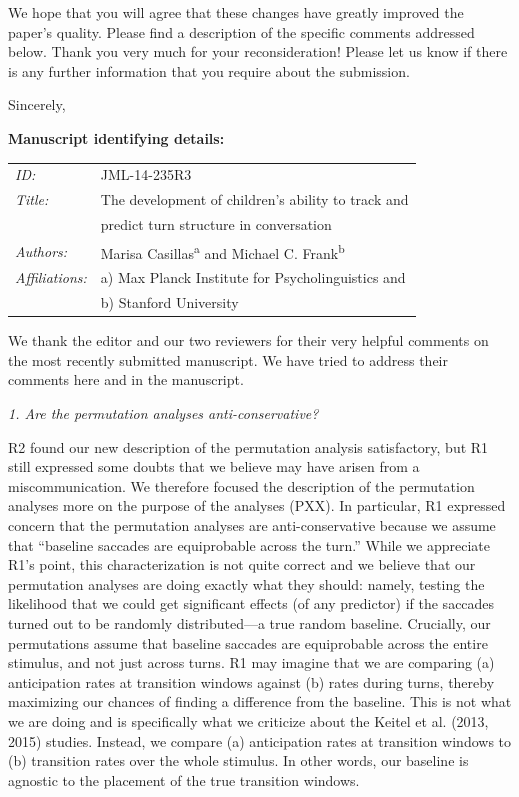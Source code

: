 \documentclass[11pt,a4paper]{letter} %
\begin{document}
\begin{letter}{}
\noindent We hope that you will agree that these changes have greatly improved the paper's quality. Please find a description of the specific comments addressed below. Thank you very much for your reconsideration! Please let us know if there is any further information that you require about the submission.

\closing{Sincerely,}

\bigskip
\bigskip

\textbf{Manuscript identifying details:}

\begin{tabular}{ll}
\textit{ID:} & JML-14-235R3 \\
\textit{Title:} & The development of children's ability to track and \\
& predict turn structure in conversation \\
\textit{Authors:} & Marisa Casillas\textsuperscript{a} and Michael C. Frank\textsuperscript{b} \\
\textit{Affiliations:} & a) Max Planck Institute for Psycholinguistics and \\
& b) Stanford University
\end{tabular}

\newpage

\noindent We thank the editor and our two reviewers for their very helpful comments on the most recently submitted manuscript. We have tried to address their comments here and in the manuscript.

\medskip

\noindent \textit{1. Are the permutation analyses anti-conservative?}

\noindent R2 found our new description of the permutation analysis satisfactory, but R1 still expressed some doubts that we believe may have arisen from a miscommunication. We therefore focused the description of the permutation analyses more on the purpose of the analyses (PXX). In particular, R1 expressed concern that the permutation analyses are anti-conservative because we assume that ``baseline saccades are equiprobable across the turn.'' While we appreciate R1's point, this characterization is not quite correct and we believe that our permutation analyses are doing exactly what they should: namely, testing the likelihood that we could get significant effects (of any predictor) if the saccades turned out to be randomly distributed---a true random baseline. Crucially, our permutations assume that baseline saccades are equiprobable across the entire stimulus, and not just across turns. R1 may imagine that we are comparing (a) anticipation rates at transition windows against (b) rates during turns, thereby maximizing our chances of finding a difference from the baseline. This is not what we are doing and is specifically what we criticize about the Keitel et al. (2013, 2015) studies. Instead, we compare (a) anticipation rates at transition windows to (b) transition rates over the whole stimulus. In other words, our baseline is agnostic to the placement of the true transition windows.


\end{letter}
\end{document}
